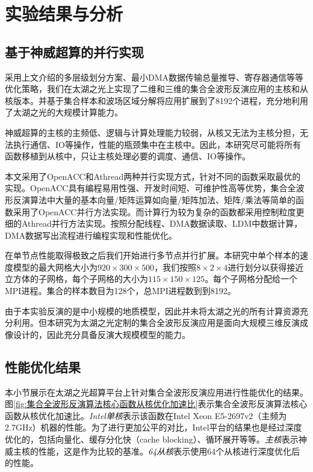 
\section{实验结果与分析} %
\label{sec:实验结果与分析}

\subsection{基于神威超算的并行实现}

采用上文介绍的多层级划分方案、最小DMA数据传输总量推导、寄存器通信等等优化策略，我们在太湖之光上实现了二维和三维的集合全波形反演应用的主核和从核版本。并基于集合样本和波场区域分解将应用扩展到了8192个进程，充分地利用了太湖之光的大规模计算能力。

神威超算的主核的主频低、逻辑与计算处理能力较弱，从核又无法为主核分担，无法执行通信、IO等操作，性能的瓶颈集中在主核中。因此，本研究尽可能将所有函数移植到从核中，只让主核处理必要的调度、通信、IO等操作。

本文采用了OpenACC和Athread两种并行实现方式，针对不同的函数采取最优的实现。OpenACC具有编程易用性强、开发时间短、可维护性高等优势，集合全波形反演算法中大量的基本向量/矩阵运算如向量/矩阵加法、矩阵/乘法等简单的函数采用了OpenACC并行方法实现。而计算行为较为复杂的函数都采用控制粒度更细的Athread并行方法实现。按照分配线程、DMA数据读取、LDM中数据计算，DMA数据写出流程进行编程实现和性能优化。

在单节点性能取得极致之后我们开始进行多节点并行扩展。本研究中单个样本的速度模型的最大网格大小为$920\times 300 \times 500$，我们按照$8\times 2 \times 4$进行划分以获得接近立方体的子网格，每个子网格的大小为$115\times150\times125$。每个子网格分配给一个MPI进程。集合的样本数目为128个，总MPI进程数到到8192。

由于本实验反演的是中小规模的地质模型，因此并未将太湖之光的所有计算资源充分利用。但本研究为太湖之光定制的集合全波形反演应用是面向大规模三维反演成像设计的，因此充分具备反演大规模模型的能力。

\subsection{性能优化结果}

本小节展示在太湖之光超算平台上针对集合全波形反演应用进行性能优化的结果。图\ref{fig:集合全波形反演算法核心函数从核优化加速比}表示集合全波形反演算法核心函数从核优化加速比。\emph{Intel单核}表示该函数在Intel Xeon E5-2697v2（主频为2.7GHz）机器的性能。为了进行更加公平的对比，Intel平台的结果也是经过深度优化的，包括向量化、缓存分化快（cache blocking）、循环展开等等。\emph{主核}表示神威主核的性能，这是作为比较的基准。\emph{64从核}表示使用64个从核进行深度优化后的性能。

